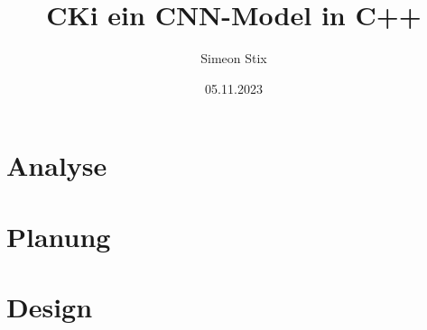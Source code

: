\documentclass[a4paper,twoside,12pt]{report}
\begin{document}
\pagestyle{empty} %



\title{CKi ein CNN-Model in C++}
\author{Simeon Stix}
\date{05.11.2023} 
\maketitle

\tableofcontents %
\cleardoublepage %

\pagestyle{plain} %

\chapter{Analyse}
\label{sec:Analyse}


\chapter{Planung}
\label{sec:Planung}


\chapter{Design}
\label{sec:Design}



\clearpage
{}
\nocite{*} %

\clearpage
{}
\listoffigures



\end{document}
